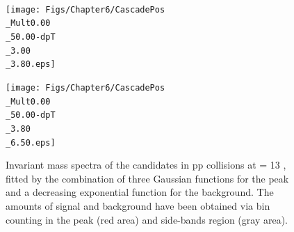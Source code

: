 \begin{figure}[!p]
\begin{minipage}[t]{.5\textwidth}
    \end{minipage}\\
    \begin{minipage}[t]{.5\textwidth}
        \hspace*{-1.5cm}
        \texttt{[image: Figs/Chapter6/CascadePos\\\_Mult0.00\\\_50.00-dpT\\\_3.00\\\_3.80.eps]}
    \end{minipage}
    \hfill
    \begin{minipage}[t]{.5\textwidth}
        \hspace*{0.5cm}
        \texttt{[image: Figs/Chapter6/CascadePos\\\_Mult0.00\\\_50.00-dpT\\\_3.80\\\_6.50.eps]}
    \end{minipage}
    \hfill
\caption{Invariant mass spectra of the \rmAomegaP candidates in pp collisions at \sqrtS = 13 \tev, fitted by the combination of three Gaussian functions for the peak and a decreasing exponential function for the background. The amounts of signal and background have been obtained via bin counting in the peak (red area) and side-bands region (gray area).}
	\label{fig:InvMassOmegaPlusVsPt}
\end{figure}



